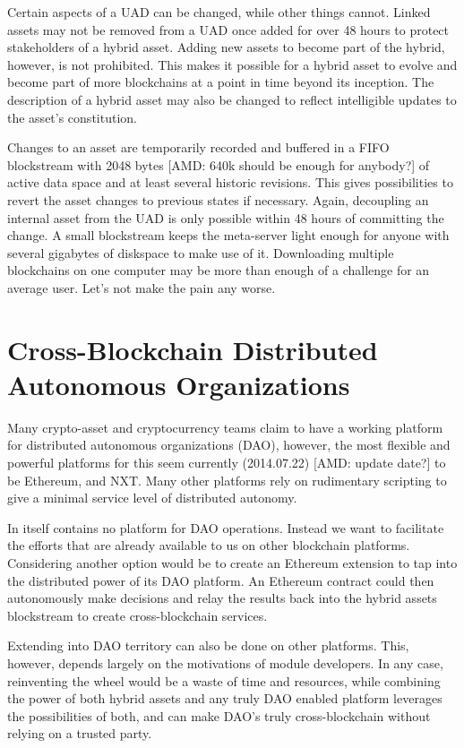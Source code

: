 \documentclass[a4paper]{article}
\begin{document}
Certain aspects of a UAD can be changed, while other things cannot. Linked assets may not be removed from a UAD once added for over 48 hours to protect stakeholders of a hybrid asset. Adding new assets to become part of the hybrid, however, is not prohibited. This makes it possible for a hybrid asset to evolve and become part of more blockchains at a point in time beyond its inception. The description of a hybrid asset may also be changed to reflect intelligible updates to the asset's constitution.

Changes to an asset are temporarily recorded and buffered in a FIFO blockstream with 2048 bytes [AMD: 640k should be enough for anybody?] of active data space and at least several historic revisions. This gives possibilities to revert the asset changes to previous states if necessary. Again, decoupling an internal asset from the UAD is only possible within 48 hours of committing the change. A small blockstream keeps the meta-server light enough for anyone with several gigabytes of diskspace to make use of it. Downloading multiple blockchains on one computer may be more than enough of a challenge for an average user. Let's not make the pain any worse.


\section{Cross-Blockchain Distributed Autonomous Organizations}

Many crypto-asset and cryptocurrency teams claim to have a working platform for distributed autonomous organizations (DAO), however, the most flexible and powerful platforms for this seem currently (2014.07.22) [AMD: update date?] to be Ethereum, and NXT. Many other platforms rely on rudimentary scripting to give a minimal service level of distributed autonomy.

In itself \hybridd contains no platform for DAO operations. Instead we want to facilitate the efforts that are already available to us on other blockchain platforms. Considering another option would be to create an Ethereum extension to tap into the distributed power of its DAO platform. An Ethereum contract could then autonomously make decisions and relay the results back into the hybrid assets blockstream to create cross-blockchain services.

Extending into DAO territory can also be done on other platforms. This, however, depends largely on the motivations of module developers. In any case, reinventing the wheel would be a waste of time and resources, while combining the power of both hybrid assets and any truly DAO enabled platform leverages the possibilities of both, and can make DAO's truly cross-blockchain without relying on a trusted party.
\end{document}
